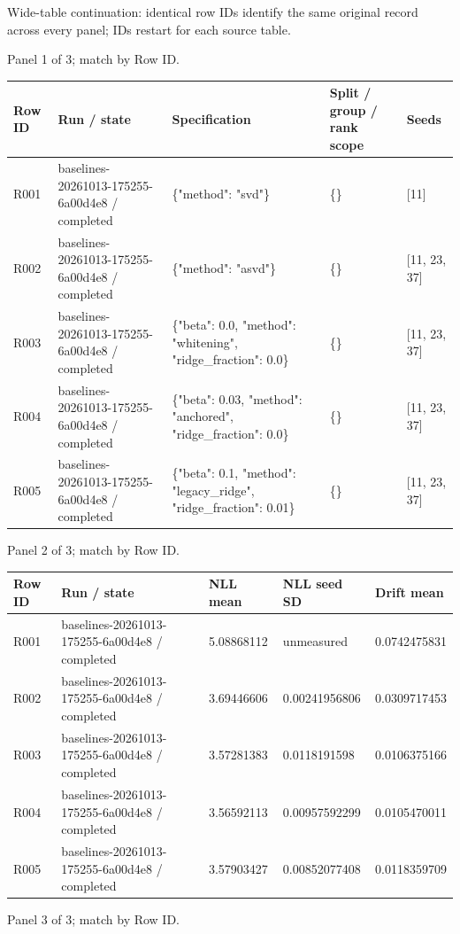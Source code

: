 \documentclass[10pt]{article}
\begin{document}
Wide-table continuation: identical row IDs identify the same original record across every panel; IDs restart for each source table.
\par\noindent Panel 1 of 3; match by Row ID.
{\scriptsize\setlength{\tabcolsep}{2pt}
\begin{longtable}{p{}p{}p{}p{}p{}}
Row ID & Run / state & Specification & Split / group / rank scope & Seeds \\
\hline\endhead
R001 & baselines-20261013-175255-6a00d4e8 / completed & \{"method": "svd"\} & \{\} & [11] \\
R002 & baselines-20261013-175255-6a00d4e8 / completed & \{"method": "asvd"\} & \{\} & [11, 23, 37] \\
R003 & baselines-20261013-175255-6a00d4e8 / completed & \{"beta": 0.0, "method": "whitening", "ridge\_fraction": 0.0\} & \{\} & [11, 23, 37] \\
R004 & baselines-20261013-175255-6a00d4e8 / completed & \{"beta": 0.03, "method": "anchored", "ridge\_fraction": 0.0\} & \{\} & [11, 23, 37] \\
R005 & baselines-20261013-175255-6a00d4e8 / completed & \{"beta": 0.1, "method": "legacy\_ridge", "ridge\_fraction": 0.01\} & \{\} & [11, 23, 37] \\
\end{longtable}}
\par\noindent Panel 2 of 3; match by Row ID.
{\scriptsize\setlength{\tabcolsep}{2pt}
\begin{longtable}{p{}p{}p{}p{}p{}}
Row ID & Run / state & NLL mean & NLL seed SD & Drift mean \\
\hline\endhead
R001 & baselines-20261013-175255-6a00d4e8 / completed & 5.08868112 & unmeasured & 0.0742475831 \\
R002 & baselines-20261013-175255-6a00d4e8 / completed & 3.69446606 & 0.00241956806 & 0.0309717453 \\
R003 & baselines-20261013-175255-6a00d4e8 / completed & 3.57281383 & 0.0118191598 & 0.0106375166 \\
R004 & baselines-20261013-175255-6a00d4e8 / completed & 3.56592113 & 0.00957592299 & 0.0105470011 \\
R005 & baselines-20261013-175255-6a00d4e8 / completed & 3.57903427 & 0.00852077408 & 0.0118359709 \\
\end{longtable}}
\par\noindent Panel 3 of 3; match by Row ID.
\end{document}
